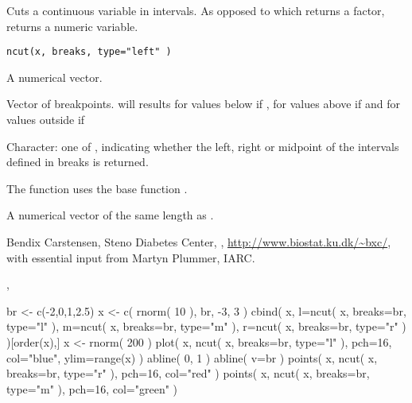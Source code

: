 \begin{Description}\relax
Cuts a continuous variable in intervals. As opposed to 
which returns a factor,  returns a numeric variable.
\end{Description}
\begin{Usage}
\begin{verbatim}
ncut(x, breaks, type="left" )
\end{verbatim}
\end{Usage}
\begin{Arguments}
\begin{ldescription}
\item[\code{x}] A numerical vector.
\item[\code{breaks}] Vector of breakpoints.  will results for values
below  if , for values
above  if  and for values
outside  if 
\item[\code{type}] Character: one of ,
indicating whether the left, right or midpoint of the intervals
defined in breaks is returned.
\end{ldescription}
\end{Arguments}
\begin{Details}\relax
The function uses the base function .
\end{Details}
\begin{Value}
A numerical vector of the same length as .
\end{Value}
\begin{Author}\relax
Bendix Carstensen, Steno Diabetes Center, ,
\url{http://www.biostat.ku.dk/~bxc/}, with essential input
from Martyn Plummer, IARC.
\end{Author}
\begin{SeeAlso}\relax
{}, 
\end{SeeAlso}
\begin{Examples}
\begin{ExampleCode}
br <- c(-2,0,1,2.5)
x <- c( rnorm( 10 ), br, -3, 3 )
cbind( x, l=ncut( x, breaks=br, type="l" ),
          m=ncut( x, breaks=br, type="m" ),
          r=ncut( x, breaks=br, type="r" ) )[order(x),]
x <- rnorm( 200 )
plot( x, ncut( x, breaks=br, type="l" ), pch=16, col="blue", ylim=range(x) )
abline( 0, 1 )
abline( v=br )
points( x, ncut( x, breaks=br, type="r" ), pch=16, col="red" )
points( x, ncut( x, breaks=br, type="m" ), pch=16, col="green" )
\end{ExampleCode}
\end{Examples}

